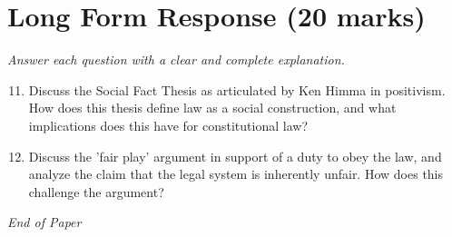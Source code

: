 \documentclass[12pt]{article}
\begin{document}
\section*{Long Form Response (20 marks)}
\textit{Answer each question with a clear and complete explanation.}
\begin{enumerate}[label=\arabic*.]
\setcounter{enumi}{10}
\item Discuss the Social Fact Thesis as articulated by Ken Himma in positivism. How does this thesis define law as a social construction, and what implications does this have for constitutional law?
\item Discuss the 'fair play' argument in support of a duty to obey the law, and analyze the claim that the legal system is inherently unfair. How does this challenge the argument?
\end{enumerate}

\vfill
\noindent\textit{End of Paper}
\end{document}
